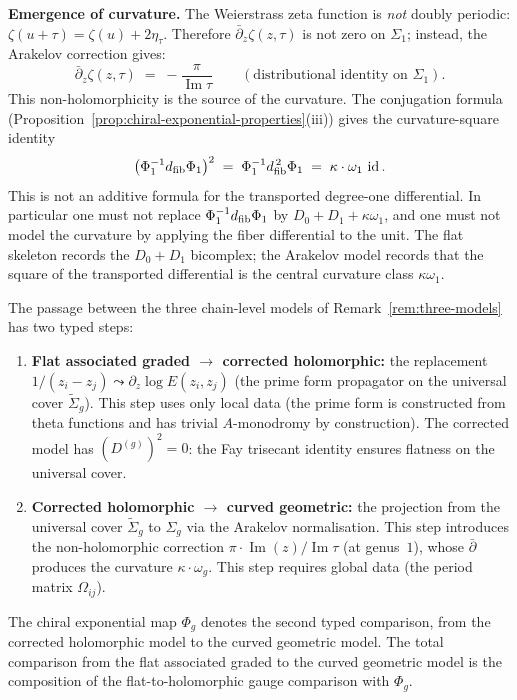\begin{example}
\smallskip\noindent
\textbf{Emergence of curvature.}
The Weierstrass zeta function is \emph{not} doubly periodic:
$\zeta(u + \tau) = \zeta(u) + 2\eta_\tau$. Therefore
$\bar\partial_z \zeta(z, \tau)$ is not zero on $\Sigma_1$;
instead, the Arakelov correction gives:
\[
\bar\partial_z \zeta(z,\tau)
\;=\;
-\frac{\pi}{\operatorname{Im}\tau}
\qquad
(\text{distributional identity on $\Sigma_1$}).
\]
This non-holomorphicity is the source of the curvature.
The conjugation formula
(Proposition~\ref{prop:chiral-exponential-properties}(iii)) gives the
curvature-square identity
\begin{equation}\label{eq:curvature-heisenberg-genus1}
\bigl(\Phi_1^{-1}d_{\mathrm{fib}}\Phi_1\bigr)^2
\;=\;
\Phi_1^{-1}d_{\mathrm{fib}}^{\,2}\Phi_1
\;=\;
\kappa\cdot\omega_1\,\operatorname{id} .
\end{equation}
This is not an additive formula for the transported degree-one
differential. In particular one must not replace
$\Phi_1^{-1}d_{\mathrm{fib}}\Phi_1$ by $D_0+D_1+\kappa\omega_1$, and one must
not model the curvature by applying the fiber differential to the
unit. The flat skeleton records the
$D_0+D_1$ bicomplex; the Arakelov model records that the square of the
transported differential is the central curvature class
$\kappa\omega_1$.
\end{example}

\begin{remark}
\label{rem:chiral-exp-three-models}
The passage between the three chain-level models of
Remark~\ref{rem:three-models} has two typed steps:
\begin{enumerate}[label=\textup{(\roman*)}]
\item \textbf{Flat associated graded $\to$ corrected
 holomorphic:} the replacement $1/(z_i - z_j) \leadsto
 \partial_z \log E(z_i, z_j)$ (the prime form propagator on the
 universal cover $\widetilde{\Sigma}_g$). This step uses only
 local data (the prime form is constructed from theta functions
 and has trivial $A$-monodromy by construction). The corrected
 model has $(D^{(g)})^2 = 0$: the Fay trisecant identity
 ensures flatness on the universal cover.
\item \textbf{Corrected holomorphic $\to$ curved geometric:}
 the projection from the universal cover
 $\widetilde{\Sigma}_g$ to $\Sigma_g$ via the Arakelov
 normalisation. This step introduces the non-holomorphic
 correction $\pi \cdot \operatorname{Im}(z)/\operatorname{Im}
 \tau$ (at genus~$1$), whose $\bar\partial$ produces the
 curvature $\kappa \cdot \omega_g$. This step requires
 global data (the period matrix $\Omega_{ij}$).
\end{enumerate}
The chiral exponential map $\Phi_g$ denotes the second typed
comparison, from the corrected holomorphic model to the curved
geometric model. The total comparison from the flat associated
graded to the curved geometric model is the composition of the
flat-to-holomorphic gauge comparison with $\Phi_g$.
\end{remark}



